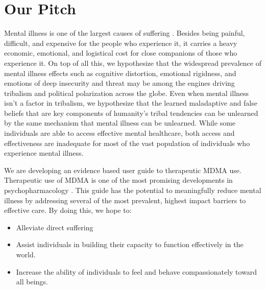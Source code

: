 \documentclass[12pt,letterpaper]{book}
\begin{document}
\section{Our Pitch}
Mental illness is one of the largest causes of suffering \cite{mentalhealthpriority}. Besides being painful, difficult, and expensive for the people who experience it, it carries a heavy economic, emotional, and logistical cost for close companions of those who experience it. On top of all this, we hypothesize that the widespread prevalence of mental illness effects such as cognitive distortion, emotional rigidness, and emotions of deep insecurity and threat may be among the engines driving tribalism and political polarization across the globe. Even when mental illness isn't a factor in tribalism, we hypothesize that the learned maladaptive and false beliefs that are key components of humanity's tribal tendencies \cite{klein2020Polarized,galefScoutMindset} can be unlearned by the same mechanism that mental illness can be unlearned. While some individuals are able to access effective mental healthcare, both access and effectiveness are inadequate for most of the vast population of individuals who experience mental illness.

We are developing an evidence based user guide to therapeutic MDMA use. Therapeutic use of MDMA is one of the most promising developments in psychopharmacology \cite{mitchellMDMAClinicalTrial2}. This guide has the potential to meaningfully reduce mental illness by addressing several of the most prevalent, highest impact barriers to effective care. By doing this, we hope to:
\begin{itemize}
	\item Alleviate direct suffering
	\item Assist individuals in building their capacity to function effectively in the world.
	\item Increase the ability of individuals to feel and behave compassionately toward all beings.
\end{itemize}
\end{document}

